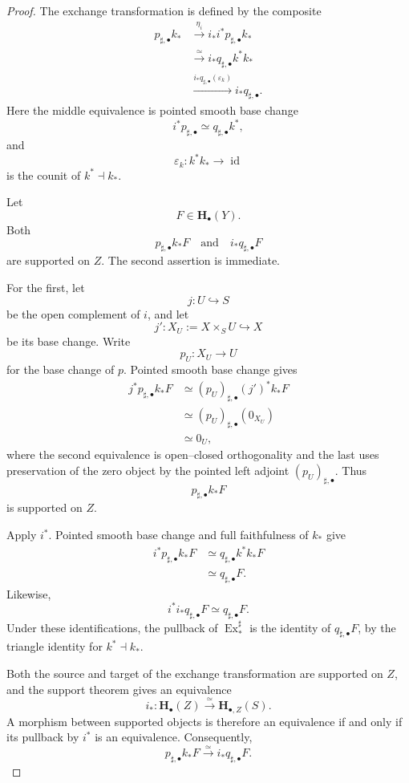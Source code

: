 \begin{proof}
The exchange transformation is defined by the composite
\[
\begin{aligned}
    p_{\sharp,\bullet}k_*
    &\xrightarrow{\eta_i}
    i_*i^*p_{\sharp,\bullet}k_*
    \\
    &\xrightarrow{\simeq}
    i_*q_{\sharp,\bullet}k^*k_*
    \\
    &\xrightarrow{
        i_*q_{\sharp,\bullet}(\varepsilon_k)
    }
    i_*q_{\sharp,\bullet}.
\end{aligned}
\]
Here the middle equivalence is pointed smooth base change
\[
    i^*p_{\sharp,\bullet}
    \simeq
    q_{\sharp,\bullet}k^*,
\]
and
\[
    \varepsilon_k
    \colon
    k^*k_*
    \longrightarrow
    \operatorname{id}
\]
is the counit of \(k^*\dashv k_*\).

Let
\[
    F
    \in
    \mathbf H_\bullet(Y).
\]
Both
\[
    p_{\sharp,\bullet}k_*F
    \quad\text{and}\quad
    i_*q_{\sharp,\bullet}F
\]
are supported on \(Z\).  The second assertion is immediate.

For the first, let
\[
    j
    \colon
    U
    \hookrightarrow
    S
\]
be the open complement of \(i\), and let
\[
    j'
    \colon
    X_U
    :=
    X\times_SU
    \hookrightarrow
    X
\]
be its base change.  Write
\[
    p_U
    \colon
    X_U
    \longrightarrow
    U
\]
for the base change of \(p\).  Pointed smooth base change gives
\[
\begin{aligned}
    j^*p_{\sharp,\bullet}k_*F
    &\simeq
    (p_U)_{\sharp,\bullet}(j')^*k_*F
    \\
    &\simeq
    (p_U)_{\sharp,\bullet}(0_{X_U})
    \\
    &\simeq
    0_U,
\end{aligned}
\]
where the second equivalence is open--closed orthogonality and the last
uses preservation of the zero object by the pointed left adjoint
\((p_U)_{\sharp,\bullet}\).  Thus
\[
    p_{\sharp,\bullet}k_*F
\]
is supported on \(Z\).

Apply \(i^*\).  Pointed smooth base change and full faithfulness of
\(k_*\) give
\[
\begin{aligned}
    i^*p_{\sharp,\bullet}k_*F
    &\simeq
    q_{\sharp,\bullet}k^*k_*F
    \\
    &\simeq
    q_{\sharp,\bullet}F.
\end{aligned}
\]
Likewise,
\[
    i^*i_*q_{\sharp,\bullet}F
    \simeq
    q_{\sharp,\bullet}F.
\]
Under these identifications, the pullback of
\(\operatorname{Ex}^{\sharp}_{*}\) is the identity of
\(q_{\sharp,\bullet}F\), by the triangle identity for
\(k^*\dashv k_*\).

Both the source and target of the exchange transformation are supported
on \(Z\), and the support theorem gives an equivalence
\[
    i_*
    \colon
    \mathbf H_\bullet(Z)
    \xrightarrow{\simeq}
    \mathbf H_{\bullet,Z}(S).
\]
A morphism between supported objects is therefore an equivalence if and
only if its pullback by \(i^*\) is an equivalence.  Consequently,
\[
    p_{\sharp,\bullet}k_*F
    \xrightarrow{\simeq}
    i_*q_{\sharp,\bullet}F.
\]
\end{proof}


